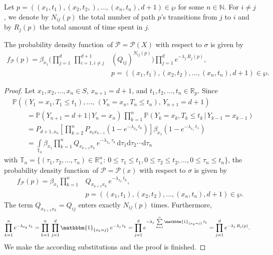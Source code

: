 \documentclass[smallextended]{svjour3}
\newcommand{\R}{\mathbb{R}}
\newcommand{\N}{\mathbb{N}}
\renewcommand{\P}{\mathbb{P}}
\newcommand{\suml}{\sum\limits}
\newcommand{\prodl}{\prod\limits}
\newcommand{\intl}{\int\limits}
\newcommand{\pdf}{probability density function}
\begin{document}
Let $p=((x_1,t_1),(x_2,t_2,),\ldots,(x_n,t_n),d+1)\in\wp$ for some $n\in\N$.
For $i\neq j$, we denote by $N_{ij}(p)$ the total number of path $p$'s transitions from $j$ to $i$ and by $R_j(p)$ the total amount of time spent in $j$.

\begin{lemma}\label{lem:path_pdf}
	The \pdf\ of $\mathcal{P}=\mathcal{P}(X)$ with respect to $\sigma$ is given by
	\begin{align*}
		f_{\mathcal{P}}(p) = \beta_{x_1}\Bigg(\prodl_{j=1}^d\,\prodl_{i=1,i\neq j}^{d+1} &(Q_{ij})^{N_{ij}(p)}\Bigg)\prodl_{j=1}^d e^{-\lambda_j\,R_j(p)},\\
		& p=((x_1,t_1),(x_2,t_2),\ldots,(x_n,t_n),d+1)\in\wp.
	\end{align*}
\end{lemma}

\begin{proof}
	Let $x_1,x_2,\ldots,x_n\in S$, $x_{n+1}=d+1$, and $t_1,t_2,\ldots,t_n\in\R_p$.
	Since
	\begin{align*}
		&\P((Y_1=x_1,T_1\leq t_1),\ldots,\,(Y_n=x_n,T_n\leq t_n),\, Y_{n+1}=d+1) \\
		&\qquad= \P(Y_{n+1}=d+1\,|\,Y_n=x_n)\,\prodl_{k=1}^n \P(Y_k=x_k,T_k\leq t_k\,|\,Y_{k-1}=x_{k-1})\\
		&\qquad= P_{d+1,x_n}\left[\prodl_{k=2}^n P_{x_{k} x_{k-1}}\left(1-e^{-\lambda_{x_k}\,t_k}\right)\right] \beta_{x_1}\left(1-e^{-\lambda_{x_1}\,t_1}\right)\\
		&\qquad= \intl_{\mathbb{T}_n} \beta_{x_1}\prodl_{k=1}^n Q_{x_{k+1}x_k}\,e^{-\lambda_{x_k}\,\tau_k}\,\mathrm{d}\tau_1\mathrm{d}\tau_2\cdots\mathrm{d}\tau_n
	\end{align*}
	with $\mathbb{T}_n=\{(\tau_1,\tau_2,\ldots,\tau_n)\in\R^n_+:\,0\leq\tau_1\leq t_1,0\leq\tau_2\leq t_2,\ldots,0\leq\tau_n\leq t_n\}$,
	the \pdf\ of $\mathcal{P}=\mathcal{P}(x)$ with respect to $\sigma$ is given by
	\begin{align*}
		f_{\mathcal{P}}(p) = \beta_{x_1}\prodl_{k=1}^n &Q_{x_{k+1}x_k}\,e^{-\lambda_{x_k}\,t_k},\\
		& p=((x_1,t_1),(x_2,t_2),\ldots,(x_n,t_n),d+1)\in\wp.
	\end{align*}
	The term $Q_{x_{k+1}x_k}=Q_{ij}$ enters exactly $N_{ij}(p)$ times.
	Furthermore,
	\begin{align*}
		\prodl_{k=1}^n e^{-\lambda_{x_k}\,t_k} &= \prodl_{k=1}^n\,\prodl_{j=1}^d \mathbbm{1}_{\{x_k=j\}}\,e^{-\lambda_j\,t_k}
		= \prodl_{j=1}^d e^{-\lambda_j\,\suml_{k=1}^n \mathbbm{1}_{\{x_k=j\}}\,t_k}
		= \prodl_{j=1}^d e^{-\lambda_j\,R_j(p)}.
	\end{align*}
	We make the according substitutions and the proof is finished.
\end{proof}
\end{document}
